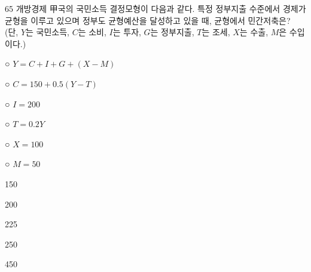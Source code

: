 \begin{question}{65}
개방경제 甲국의 국민소득 결정모형이 다음과 같다. 특정 정부지출 수준에서 경제가 균형을 이루고 있으며 정부도 균형예산을 달성하고 있을 때, 균형에서 민간저축은? (단, ${ Y }$는 국민소득, ${ C }$는 소비, ${ I }$는 투자, ${ G }$는 정부지출, ${ T }$는 조세, ${ X }$는 수출, ${ M }$은 수입이다.)
\begin{framedtext}
○ ${ Y=C+I+G+(X-M) }$ \par
○ ${ C=150+0.5(Y-T) }$ \par
○ ${ I=200 }$ \par
○ ${ T=0.2Y }$ \par
○ ${ X=100 }$ \par
○ ${ M=50 }$
\end{framedtext}
\begin{choices}
  \item 150
  \item 200
  \item 225
  \item 250
  \item 450
\end{choices}
\end{question}
